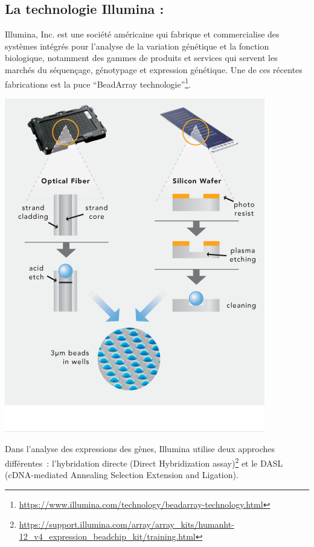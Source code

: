 \documentclass[a4paper,10pt]{article}
\begin{document}
\subsection{La technologie Illumina :}
Illumina, Inc. est une société américaine qui fabrique et commercialise des systèmes intégrés pour l'analyse de la variation génétique et la fonction biologique, 
notamment des gammes de produits et services qui servent les marchés du séquençage, génotypage et expression génétique.
\newline
Une de ces récentes fabrications est la puce ``BeadArray technologie''\footnote{\url{https://www.illumina.com/technology/beadarray-technology.html}}.
\begin{center}
 \includegraphics[scale=0.5]{./image/beadarray.png}
\end{center}
Dans l’analyse des expressions des gènes, Illumina utilise deux approches différentes : l’hybridation directe (Direct Hybridization assay)\footnote{\url{https://support.illumina.com/array/array\_kits/humanht-12\_v4\_expression\_beadchip\_kit/training.html}} et le DASL (cDNA-mediated Annealing Selection Extension and Ligation).
\end{document}
